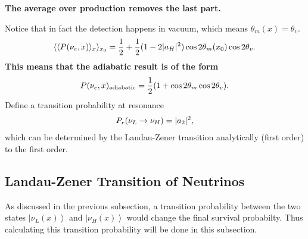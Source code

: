 \documentclass[letterpaper,12pt,english]{sphinxmanual}
\newcommand{\ket}[1]{\left| #1\right\rangle}
\begin{document}
\textbf{The average over production removes the last part.}

Notice that in fact the detection happens in vacuum, which means \(\theta_m(x)=\theta_v\).
\begin{gather}
\begin{split}\langle \langle P(\nu_e,x)\rangle_{x} \rangle_{x_0}= \frac{1}{2} + \frac{1}{2}(1- 2\lvert a_H \rvert^2) \cos 2\theta_m(x_0) \cos 2\theta_v .\end{split}\notag
\end{gather}
\textbf{This means that the adiabatic result is of the form}
\begin{gather}
\begin{split}P(\nu_e,x)_{\mathrm{adiabatic}} = \frac{1}{2} ( 1+ \cos 2\theta_m \cos 2\theta_v ).\end{split}\notag
\end{gather}
Define a transition probability at resonance
\begin{gather}
\begin{split}P_r(\nu_L \to \nu_H) = \lvert a_2 \rvert^2,\end{split}\notag
\end{gather}
which can be determined by the Landau-Zener transition analytically (first order) to the first order.


\subsection{Landau-Zener Transition of Neutrinos}
\label{msw:landau-zener-transition-of-neutrinos}\label{msw:index-3}
As discussed in the previous subsection, a transition probability between the two states \(\ket{\nu_L(x)}\) and \(\ket{\nu_H(x)}\) would change the final survival probabilty. Thus calculating this transition probability will be done in this subsection.
\end{document}
